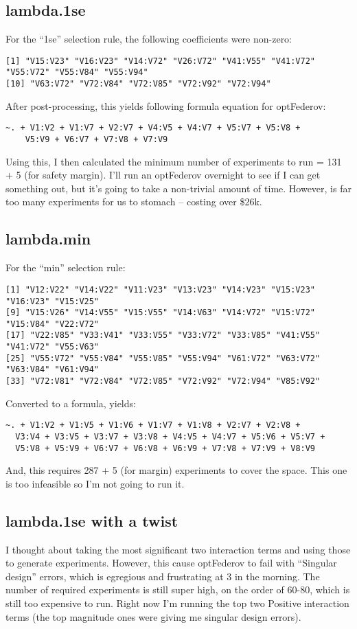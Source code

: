\subsection{lambda.1se}
For the ``1se'' selection rule, the following coefficients were non-zero:
\begin{verbatim}
[1] "V15:V23" "V16:V23" "V14:V72" "V26:V72" "V41:V55" "V41:V72" "V55:V72" "V55:V84" "V55:V94"
[10] "V63:V72" "V72:V84" "V72:V85" "V72:V92" "V72:V94"
\end{verbatim}

After post-processing, this yields following formula equation for optFederov:
\begin{verbatim}
~. + V1:V2 + V1:V7 + V2:V7 + V4:V5 + V4:V7 + V5:V7 + V5:V8 + 
    V5:V9 + V6:V7 + V7:V8 + V7:V9
\end{verbatim}

Using this, I then calculated the minimum number of experiments to run = 131 + 5 (for safety margin).  I'll run an optFederov overnight to see if I can get something out, but it's going to take a non-trivial amount of time.  However, is far too many experiments for us to stomach -- costing over \$26k.

\subsection{lambda.min}
For the ``min'' selection rule:
\begin{verbatim}
[1] "V12:V22" "V14:V22" "V11:V23" "V13:V23" "V14:V23" "V15:V23" "V16:V23" "V15:V25"
[9] "V15:V26" "V14:V55" "V15:V55" "V14:V63" "V14:V72" "V15:V72" "V15:V84" "V22:V72"
[17] "V22:V85" "V33:V41" "V33:V55" "V33:V72" "V33:V85" "V41:V55" "V41:V72" "V55:V63"
[25] "V55:V72" "V55:V84" "V55:V85" "V55:V94" "V61:V72" "V63:V72" "V63:V84" "V61:V94"
[33] "V72:V81" "V72:V84" "V72:V85" "V72:V92" "V72:V94" "V85:V92"
\end{verbatim}

Converted to a formula, yields:
\begin{verbatim}
~. + V1:V2 + V1:V5 + V1:V6 + V1:V7 + V1:V8 + V2:V7 + V2:V8 + 
  V3:V4 + V3:V5 + V3:V7 + V3:V8 + V4:V5 + V4:V7 + V5:V6 + V5:V7 + 
  V5:V8 + V5:V9 + V6:V7 + V6:V8 + V6:V9 + V7:V8 + V7:V9 + V8:V9
\end{verbatim}

And, this requires 287 + 5 (for margin) experiments to cover the space.  This one is too infeasible so I'm not going to run it.

\subsection{lambda.1se with a twist}\label{sec:hope}
I thought about taking the most significant two interaction terms and using those to generate experiments.  However, this cause optFederov to fail with ``Singular design'' errors, which is egregious and frustrating at 3 in the morning.  The number of required experiments is still super high, on the order of 60-80, which is still too expensive to run.  Right now I'm running the top two Positive interaction terms (the top magnitude ones were giving me singular design errors).

